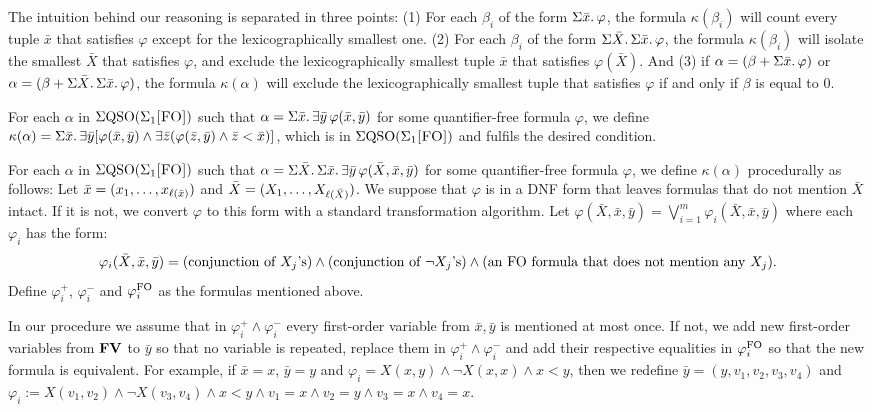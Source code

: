 The intuition behind our reasoning is separated in three points: (1) For each $\beta_i$ of the form $\Sigma{\bar{x}}.\,\varphi$, the formula $\kappa(\beta_i)$ will count every tuple $\bar{x}$ that satisfies $\varphi$ except for the lexicographically smallest one. (2) For each $\beta_i$ of the form $\Sigma{\bar{X}}.\,\Sigma{\bar{x}}.\,\varphi$, the formula $\kappa(\beta_i)$ will isolate the smallest $\bar{X}$ that satisfies $\varphi$, and exclude the lexicographically smallest tuple $\bar{x}$ that satisfies $\varphi(\bar{X})$. And (3) if $\alpha = (\beta+\Sigma{\bar{x}}.\,\varphi)$ or $\alpha = (\beta+\Sigma{\bar{X}}.\,\Sigma{\bar{x}}.\,\varphi)$, the formula $\kappa(\alpha)$ will exclude the lexicographically smallest tuple that satisfies $\varphi$ if and only if $\beta$ is equal to 0.

\vspace{1em}

For each $\alpha$ in $\Sigma{\rm QSO}(\Sigma_{1}\textsc{[FO]})$ such that $\alpha = \Sigma{\bar{x}}.\,\exists\bar{y}\,\varphi(\bar{x},\bar{y})$ for some quantifier-free formula $\varphi$, we define $\kappa(\alpha) = \Sigma{\bar{x}}.\,\exists\bar{y}[\varphi(\bar{x},\bar{y})\wedge\exists\bar{z}(\varphi(\bar{z},\bar{y})\wedge\bar{z} < \bar{x})]$, which is in $\Sigma{\rm QSO}(\Sigma_{1}\textsc{[FO]})$ and fulfils the desired condition.

\vspace{1em}

For each $\alpha$ in $\Sigma{\rm QSO}(\Sigma_{1}\textsc{[FO]})$ such that $\alpha = \Sigma{\bar{X}}.\,\Sigma{\bar{x}}.\,\exists\bar{y}\,\varphi(\bar{X},\bar{x},\bar{y})$ for some quantifier-free formula $\varphi$, we define $\kappa(\alpha)$ procedurally as follows: Let $\bar{x} = (x_1,\ldots,x_{\ell(\bar{x})})$ and $\bar{X} = (X_1,\ldots,X_{\ell(\bar{X})})$. We suppose that $\varphi$ is in a DNF form that leaves formulas that do not mention $\bar{X}$ intact. If it is not, we convert $\varphi$ to this form with a standard transformation algorithm. Let $\varphi(\bar{X},\bar{x},\bar{y}) = \bigvee_{i = 1}^m\varphi_i(\bar{X},\bar{x},\bar{y})$ where each $\varphi_i$ has the form:
$$
\varphi_i(\bar{X},\bar{x},\bar{y}) = (\text{conjunction of $X_j$'s}) \wedge (\text{conjunction of $\neg X_j$'s})  \wedge (\text{an ${\rm FO}$ formula that does not mention any $X_j$}).
$$
Define $\varphi_i^{+}$, $\varphi_i^{-}$ and $\varphi_i^{{\rm FO}}$ as the formulas mentioned above. 

In our procedure we assume that in $\varphi_i^{+}\wedge\varphi_i^{-}$ every first-order variable from $\bar{x},\bar{y}$ is mentioned at most once. If not, we add new first-order variables from $\mathbf{FV}$ to $\bar{y}$ so that no variable is repeated, replace them in $\varphi_i^{+}\wedge\varphi_i^{-}$ and add their respective equalities in $\varphi_i^{{\rm FO}}$ so that the new formula is equivalent. For example, if $\bar{x} = x$, $\bar{y} = y$ and $\varphi_i = X(x,y)\wedge \neg X(x,x) \wedge x < y$, then we redefine $\bar{y} = (y,v_1,v_2,v_3,v_4)$ and $\varphi_i := X(v_1,v_2) \wedge \neg X(v_3,v_4) \wedge x < y \wedge v_1 = x \wedge v_2 = y \wedge v_3 = x \wedge v_4 = x.$ 

